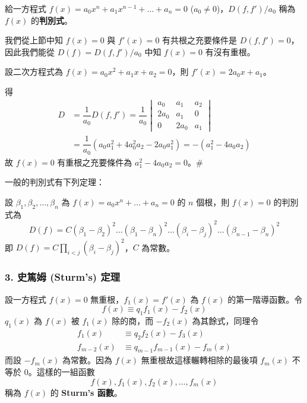\begin{definition}\label{def:b6-app3-discriminant}
給一方程式 $f(x) = a_0 x^n + a_1 x^{n-1} + \dots + a_n = 0$ ($a_0 \ne 0$)，$D(f, f')/a_0$ 稱為 $f(x)$ 的\textbf{判別式}。
\end{definition}

我們從上節中知 $f(x)=0$ 與 $f'(x)=0$ 有共根之充要條件是 $D(f, f') = 0$，因此我們能從 $D(f) = D(f, f')/a_0$ 中知 $f(x)=0$ 有沒有重根。

\begin{example}\label{ex:b6-app3-2}
設二次方程式為 $f(x)=a_0 x^2 + a_1 x + a_2 = 0$，則 $f'(x)=2a_0 x + a_1$。
\end{example}

得
\begin{align*}
D &= \dfrac{1}{a_0} D(f, f') = \dfrac{1}{a_0} \begin{vmatrix}
a_0 & a_1 & a_2 \\
2a_0 & a_1 & 0 \\
0 & 2a_0 & a_1
\end{vmatrix} \\
&= \dfrac{1}{a_0}(a_0 a_1^2 + 4a_0^2 a_2 - 2a_0 a_1^2) = -(a_1^2 - 4a_0 a_2)
\end{align*}
故 $f(x)=0$ 有重根之充要條件為 $a_1^2 - 4a_0 a_2 = 0$。\hfill$\#$

一般的判別式有下列定理：

\begin{theorem}\label{thm:b6-app3-disc-roots}
設 $\beta_1, \beta_2, \dots, \beta_n$ 為 $f(x) = a_0 x^n + \dots + a_n = 0$ 的 $n$ 個根，則 $f(x)=0$ 的判別式為
\[ D(f) = C(\beta_1-\beta_2)^2 \dots (\beta_1-\beta_n)^2 \dots (\beta_i-\beta_j)^2 \dots (\beta_{n-1}-\beta_n)^2 \]
即 $D(f) = C \prod_{i<j} (\beta_i-\beta_j)^2$，$C$ 為常數。
\end{theorem}

\subsubsection*{3. 史篤姆 (Sturm's) 定理}\label{subsec:b6-app3-3}

設一方程式 $f(x)=0$ 無重根，$f_1(x)=f'(x)$ 為 $f(x)$ 的第一階導函數。令
\begin{equation}
f(x) \equiv q_1 f_1(x) - f_2(x) \label{eq:b6-app3-sturm-1}
\end{equation}
$q_1(x)$ 為 $f(x)$ 被 $f_1(x)$ 除的商，而 $-f_2(x)$ 為其餘式，同理令
\begin{align}
f_1(x) &\equiv q_2 f_2(x) - f_3(x) \label{eq:b6-app3-sturm-2} \\
f_{m-2}(x) &\equiv q_{m-1} f_{m-1}(x) - f_m(x) \label{eq:b6-app3-sturm-3}
\end{align}
而設 $-f_m(x)$ 為常數。因為 $f(x)$ 無重根故這樣輾轉相除的最後項 $f_m(x)$ 不等於 0。這樣的一組函數
\[ f(x), f_1(x), f_2(x), \dots, f_m(x) \]
稱為 $f(x)$ 的 \textbf{Sturm's 函數}。

